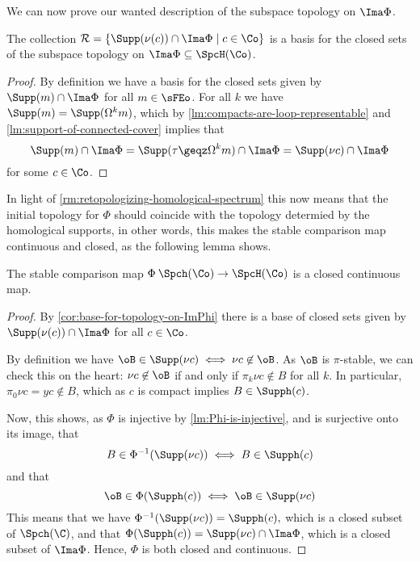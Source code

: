 
We can now prove our wanted description of the subspace topology on $\Ima\Phi$. 

\begin{lemma}
    \label{cor:base-for-topology-on-ImPhi}
    The collection $\mathcal{R} = \{\Supp(\nu(c))\cap \Ima\Phi \mid c\in \Co\}$ is a basis for the closed sets of the subspace topology on $\Ima\Phi\subseteq \SpcH(\Co)$. 
\end{lemma}
\begin{proof}
    By definition we have a basis for the closed sets given by $\Supp(m)\cap \Ima \Phi$ for all $m\in \sFEo$. For all $k$ we have $\Supp(m) = \Supp(\Omega^k m)$, which by \cref{lm:compacts-are-loop-representable} and \cref{lm:support-of-connected-cover} implies that 
    \[\Supp(m)\cap \Ima\Phi = \Supp(\tau\geqz \Omega^k m)\cap \Ima\Phi = \Supp(\nu c) \cap \Ima\Phi\]
    for some $c\in \Co$. 
\end{proof}

In light of \cref{rm:retopologizing-homological-spectrum} this now means that the initial topology for $\Phi$ should coincide with the topology determied by the homological supports, in other words, this makes the stable comparison map continuous and closed, as the following lemma shows.

\begin{lemma}
    \label{lm:Phi-is-continuous-and-closed}
    The stable comparison map $\Phi\: \Spch(\Co)\to \SpcH(\Co)$ is a closed continuous map. 
\end{lemma}
\begin{proof}
    By \cref{cor:base-for-topology-on-ImPhi} there is a base of closed sets given by $\Supp(\nu(c))\cap \Ima\Phi$ for all $c\in \Co$. 

    By definition we have $\oB \in \Supp(\nu c) \iff \nu c \not\in \oB$. As $\oB$ is $\pi$-stable, we can check this on the heart: $\nu c \not\in \oB$ if and only if $\pi_k \nu c \not\in B$ for all $k$. In particular, $\pi_0 \nu c = yc \not\in B$, which as $c$ is compact implies $B\in \Supph(c)$. 
    
    Now, this shows, as $\Phi$ is injective by \cref{lm:Phi-is-injective}, and is surjective onto its image, that 
    \[B\in \Phi^{-1}(\Supp(\nu c)) \iff B\in \Supph(c)\]
    and that 
    \[\oB\in \Phi(\Supph(c)) \iff \oB\in \Supp(\nu c)\]
    This means that we have $\Phi^{-1}(\Supp(\nu c)) = \Supph(c),$ which is a closed subset of $\Spch(\C)$, and that $\Phi(\Supph(c)) = \Supp(\nu c)\cap \Ima\Phi$, which is a closed subset of $\Ima\Phi$. Hence, $\Phi$ is both closed and continuous. 
\end{proof}



